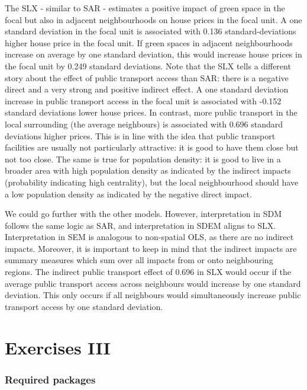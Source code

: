\documentclass[
  letterpaper,
]{scrbook}
\begin{document}
The SLX - similar to SAR - estimates a positive impact of green space in
the focal but also in adjacent neighbourhoods on house prices in the
focal unit. A one standard deviation in the focal unit is associated
with 0.136 standard-deviations higher house price in the focal unit. If
green spaces in adjacent neighbourhoods increase on average by one
standard deviation, this would increase house prices in the focal unit
by 0.249 standard deviations. Note that the SLX tells a different story
about the effect of public transport access than SAR: there is a
negative direct and a very strong and positive indirect effect. A one
standard deviation increase in public transport access in the focal unit
is associated with -0.152 standard deviations lower house prices. In
contrast, more public transport in the local surrounding (the average
neighbours) is associated with 0.696 standard deviations higher prices.
This is in line with the idea that public transport facilities are
usually not particularly attractive: it is good to have them close but
not too close. The same is true for population density: it is good to
live in a broader area with high population density as indicated by the
indirect impacts (probability indicating high centrality), but the local
neighbourhood should have a low population density as indicated by the
negative direct impact.

We could go further with the other models. However, interpretation in
SDM follows the same logic as SAR, and interpretation in SDEM aligns to
SLX. Interpretation in SEM is analogous to non-spatial OLS, as there are
no indirect impacts. Moreover, it is important to keep in mind that the
indirect impacts are summary measures which sum over all impacts from or
onto neighbouring regions. The indirect public transport effect of 0.696
in SLX would occur if the average public transport access across
neighbours would increase by one standard deviation. This only occurs if
all neighbours would simultaneously increase public transport access by
one standard deviation.


\hypertarget{exercises-iii}{%
\chapter{Exercises III}\label{exercises-iii}}

\hypertarget{required-packages-10}{%
\subsection*{Required packages}\label{required-packages-10}}
\end{document}
